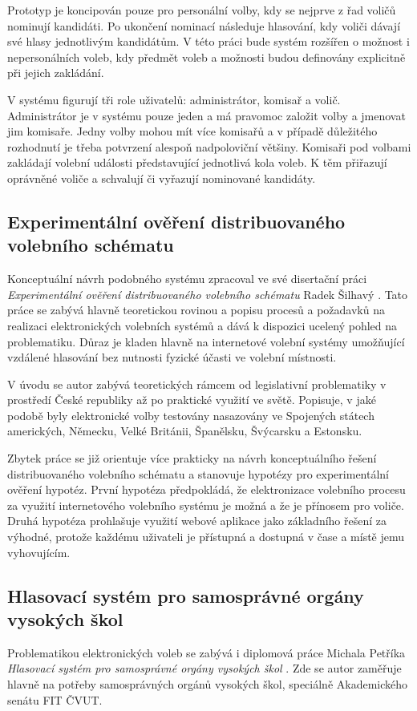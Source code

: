 \documentclass[11pt,twoside,a4paper]{book}
\begin{document}
Prototyp je koncipován pouze pro personální volby, kdy se nejprve z řad voličů nominují kandidáti. Po ukončení nominací následuje hlasování, kdy voliči dávají své hlasy jednotlivým kandidátům. V této práci bude systém rozšířen o možnost i nepersonálních voleb, kdy předmět voleb a možnosti budou definovány explicitně při jejich zakládání.

V systému figurují tři role uživatelů: administrátor, komisař a volič. Administrátor je v systému pouze jeden a má pravomoc založit volby a jmenovat jim komisaře. Jedny volby mohou mít více komisařů a v případě důležitého rozhodnutí je třeba potvrzení alespoň nadpoloviční většiny. Komisaři pod volbami zakládají volební události představující jednotlivá kola voleb. K těm přiřazují oprávněné voliče a schvalují či vyřazují nominované kandidáty.

\subsection{Experimentální ověření distribuovaného volebního schématu}
Konceptuální návrh podobného systému zpracoval ve své disertační práci \textit{Experimentální ověření distribuovaného
volebního schématu} Radek Šilhavý \cite{art:silhavy}. Tato práce se zabývá hlavně teoretickou rovinou a popisu procesů a požadavků na realizaci elektronických volebních systémů a dává k dispozici ucelený pohled na problematiku. Důraz je kladen hlavně na internetové volební systémy umožňující vzdálené hlasování bez nutnosti fyzické účasti ve volební místnosti.

V úvodu se autor zabývá teoretických rámcem od legislativní problematiky v prostředí České republiky až po praktické využití ve světě. Popisuje, v jaké podobě byly elektronické volby testovány nasazovány ve Spojených státech amerických, Německu, Velké Británii, Španělsku, Švýcarsku a Estonsku.

Zbytek práce se již orientuje více prakticky na návrh konceptuálního řešení distribuovaného volebního schématu a stanovuje hypotézy pro experimentální ověření hypotéz. První hypotéza předpokládá, že elektronizace volebního procesu za využití internetového volebního systému je možná a že je přínosem pro voliče. Druhá hypotéza prohlašuje využití webové aplikace jako základního řešení za výhodné, protože každému uživateli je přístupná a dostupná v čase a místě jemu vyhovujícím.

\subsection{Hlasovací systém pro samosprávné orgány vysokých škol}
Problematikou elektronických voleb se zabývá i diplomová práce Michala Petříka \textit{Hlasovací systém pro samosprávné orgány vysokých škol} \cite{art:petrik}. Zde se autor zaměřuje hlavně na potřeby samosprávných orgánů vysokých škol, speciálně Akademického senátu FIT ČVUT. 
\end{document}
